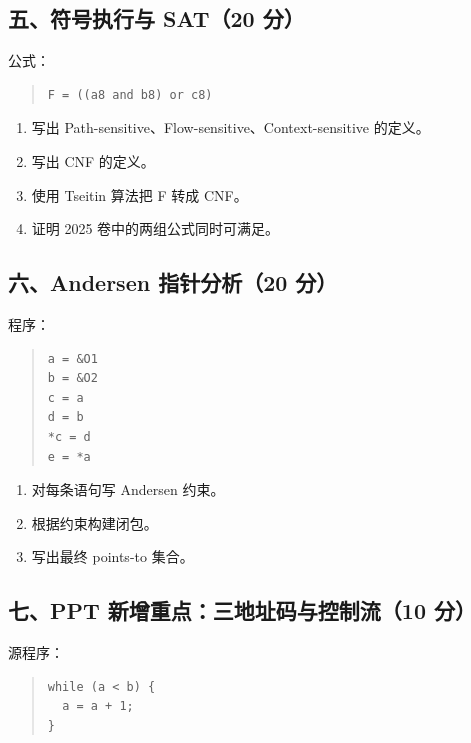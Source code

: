 \documentclass[UTF8,zihao=-4]{ctexart}
\begin{document}
\subsection{五、符号执行与 SAT（20 分）}


公式：


\begin{quote}
\footnotesize
\begin{verbatim}
F = ((a8 and b8) or c8)
\end{verbatim}
\end{quote}


\begin{enumerate}
\item 写出 Path-sensitive、Flow-sensitive、Context-sensitive 的定义。
\item 写出 CNF 的定义。
\item 使用 Tseitin 算法把 F 转成 CNF。
\item 证明 2025 卷中的两组公式同时可满足。
\end{enumerate}


\subsection{六、Andersen 指针分析（20 分）}


程序：


\begin{quote}
\footnotesize
\begin{verbatim}
a = &O1
b = &O2
c = a
d = b
*c = d
e = *a
\end{verbatim}
\end{quote}


\begin{enumerate}
\item 对每条语句写 Andersen 约束。
\item 根据约束构建闭包。
\item 写出最终 points-to 集合。
\end{enumerate}


\subsection{七、PPT 新增重点：三地址码与控制流（10 分）}


源程序：

\begin{quote}
\footnotesize
\begin{verbatim}
while (a < b) {
  a = a + 1;
}
\end{verbatim}
\end{quote}
\end{document}
